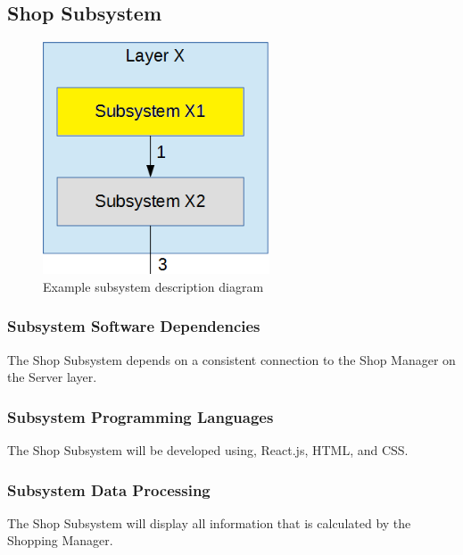 \subsection{Shop Subsystem}

\begin{figure}[h!]
	\centering
 	\includegraphics[width=0.60\textwidth]{images/subsystem}
 \caption{Example subsystem description diagram}
\end{figure}

\subsubsection{Subsystem Software Dependencies}
The Shop Subsystem depends on a consistent connection to the Shop Manager on the Server layer.

\subsubsection{Subsystem Programming Languages}
The Shop Subsystem will be developed using, React.js, HTML, and CSS.

\subsubsection{Subsystem Data Processing}
The Shop Subsystem will display all information that is calculated by the Shopping Manager.


